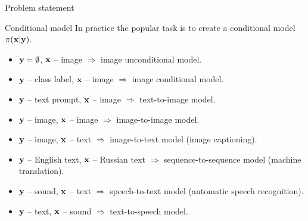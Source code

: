 \begin{frame}{Problem statement}
	\begin{block}{Conditional model}
		In practice the popular task is to create a conditional model~$\pi(\mathbf{x} | \mathbf{y})$. 
		\begin{itemize}
			\item $\mathbf{y} = \emptyset$, $\mathbf{x}$ -- image $\Rightarrow$ image unconditional model.
			\item $\mathbf{y}$ -- class label, $\mathbf{x}$ -- image $\Rightarrow$ image conditional model.
			\item $\mathbf{y}$ -- text prompt, $\mathbf{x}$ -- image $\Rightarrow$ text-to-image model.
			\item $\mathbf{y}$ -- image, $\mathbf{x}$ -- image $\Rightarrow$ image-to-image model.
			\item $\mathbf{y}$ -- image, $\mathbf{x}$ -- text $\Rightarrow$ image-to-text model (image captioning).
			\item $\mathbf{y}$ -- English text, $\mathbf{x}$ -- Russian text $\Rightarrow$ sequence-to-sequence model (machine translation).
			\item $\mathbf{y}$ -- sound, $\mathbf{x}$ -- text $\Rightarrow$ speech-to-text model (automatic speech recognition).
			\item $\mathbf{y}$ -- text, $\mathbf{x}$ -- sound $\Rightarrow$ text-to-speech model.
		\end{itemize}
	\end{block}
\end{frame}
